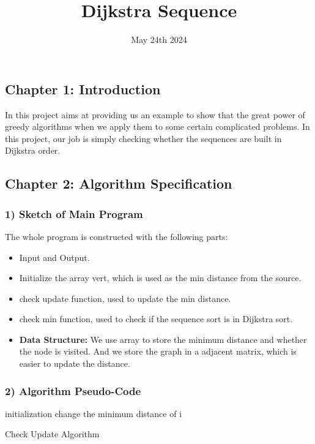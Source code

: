 \documentclass{article}
\title{\bf Dijkstra Sequence}
\author{}
\date{May 24th 2024}
\begin{document}
\maketitle
\newpage

\subsection*{\bf Chapter 1: Introduction}
In this project aims at providing us an example to show that the great power of greedy algorithms when we apply them to some certain complicated problems. In this project, our job is simply checking whether the sequences are built in Dijkstra order.

\subsection*{\bf Chapter 2: Algorithm Specification}

\subsubsection*{\bf 1) Sketch of Main Program}

The whole program is constructed with the following parts:
\begin{itemize}
\item Input and Output.
\item Initialize the array vert, which is used as the min distance from the source.
\item check update function, used to update the min distance.
\item check min function, used to check if the sequence sort is in Dijkstra sort.
\item {\bf Data Structure:} We use array to store the minimum distance and whether the node is visited. And we store the graph in a adjacent matrix, which is easier to update the distance.
\end{itemize}

\subsubsection*{2) Algorithm Pseudo-Code}
\begin{algorithm}[H]
	\SetAlgoLined

	initialization\;
	{
		{
			{
				change the minimum distance of i
			}
		}
	}
	\caption{Check Update Algorithm}
\end{algorithm}
\end{document}
